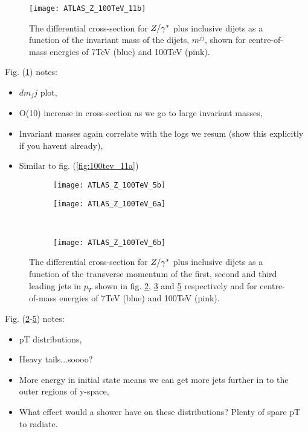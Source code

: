 	\begin{figure}[h]
		\centering
		\texttt{[image: ATLAS\_Z\_100TeV\_11b]}
		\caption{The differential cross-section for $Z/\gamma^*$ plus inclusive dijets as a function of the invariant mass
		         of the dijets, $m^{jj}$, shown for centre-of-mass energies of 7TeV (blue) and 100TeV (pink).}
		\label{fig:100tev_11b}
	\end{figure}

	Fig. (\ref{fig:100tev_11b}) notes:

	\begin{itemize}
		\item $dm_jj$ plot,
		\item O(10) increase in cross-section as we go to large invariant masses,
		\item Invariant masses again correlate with the logs we resum (show this explicitly if you havent already),
		\item Similar to fig. (\ref{fig:100tev_11a})
	\end{itemize}

	\begin{figure}[h]
		\centering
		\begin{subfigure}[b]{0.48\textwidth}
			\texttt{[image: ATLAS\_Z\_100TeV\_5b]}
			\caption{}
			\label{fig:100tev_5b}
		\end{subfigure}

		\begin{subfigure}[b]{0.48\textwidth}
			\texttt{[image: ATLAS\_Z\_100TeV\_6a]}
			\caption{}
			\label{fig:100tev_6a}
		\end{subfigure}
		~
		\begin{subfigure}[b]{0.48\textwidth}
			\texttt{[image: ATLAS\_Z\_100TeV\_6b]}
			\caption{}
			\label{fig:100tev_6b}
		\end{subfigure}
		\caption{The differential cross-section for $Z/\gamma^*$ plus inclusive dijets as a function of the transverse momentum
		         of the first, second and third leading jets in $p_T$ shown in fig. \ref{fig:100tev_5b}, \ref{fig:100tev_6a}
		         and \ref{fig:100tev_6b} respectively and for centre-of-mass energies of 7TeV (blue) and 100TeV (pink).}
	\end{figure}

	Fig. (\ref{fig:100tev_5b}-\ref{fig:100tev_6b}) notes:

	\begin{itemize}
		\item pT distributions,
		\item Heavy tails...soooo?
		\item More energy in initial state means we can get more jets further in to the outer regions of y-space,
		\item What effect would a shower have on these distributions?  Plenty of spare pT to radiate.
	\end{itemize}

